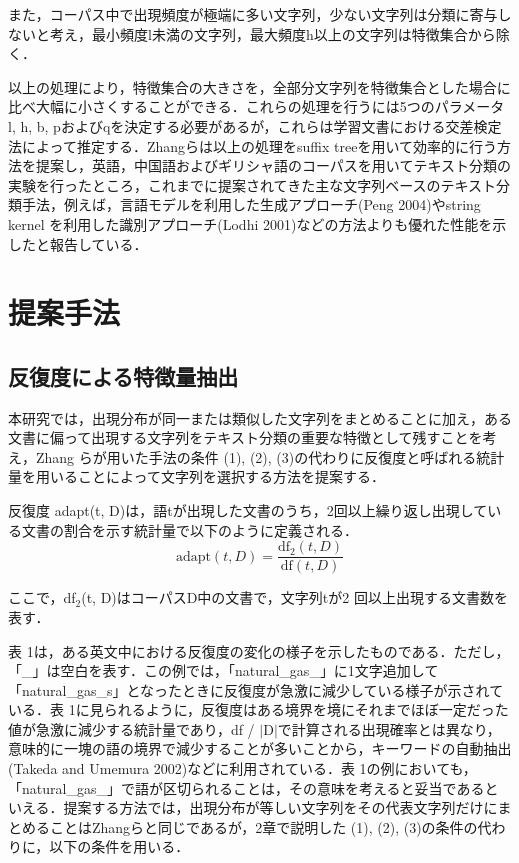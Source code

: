 \documentclass[japanese]{jnlp_1.4}
\begin{document}
また，コーパス中で出現頻度が極端に多い文字列，少ない文字列は分類に寄与しないと考え，最小頻度l未満の文字列，最大頻度h以上の文字列は特徴集合から除く．

以上の処理により，特徴集合の大きさを，全部分文字列を特徴集合とした場合に比べ大幅に小さくすることができる．これらの処理を行うには5つのパラメータl, 
h, b, 
pおよびqを決定する必要があるが，これらは学習文書における交差検定法によって推定する．Zhangらは以上の処理をsuffix 
treeを用いて効率的に行う方法を提案し，英語，中国語およびギリシャ語のコーパスを用いてテキスト分類の実験を行ったところ，これまでに提案されてきた主な文字列ベースのテキスト分類手法，例えば，言語モデルを利用した生成アプローチ(Peng 2004)やstring kernel を利用した識別アプローチ(Lodhi 2001)などの方法よりも優れた性能を示したと報告している．



\section{提案手法}


\subsection{反復度による特徴量抽出}

本研究では，出現分布が同一または類似した文字列をまとめることに加え，ある文書に偏って出現する文字列をテキスト分類の重要な特徴として残すことを考え，Zhang 
らが用いた手法の条件 (1), (2), (3)の代わりに反復度と呼ばれる統計量を用いることによって文字列を選択する方法を提案する．

反復度 adapt(t, D)は，語tが出現した文書のうち，2回以上繰り返し出現している文書の割合を示す統計量で以下のように定義される．
\[
 \text{adapt} (t,D) = \frac{\text{df}_{2}(t,D)}{\text{df}(t,D)}
\]

ここで，df$_{2}$(t, D)はコーパスD中の文書で，文字列tが2 
回以上出現する文書数を表す．



表 1は，ある英文中における反復度の変化の様子を示したものである．ただし，「{\_}」は空白を表す．この例では，「natural{\_}gas{\_}」に1文字追加して「natural{\_}gas{\_}s」となったときに反復度が急激に減少している様子が示されている．表 
1に見られるように，反復度はある境界を境にそれまでほぼ一定だった値が急激に減少する統計量であり，df 
/ $\vert $D$\vert 
$で計算される出現確率とは異なり，意味的に一塊の語の境界で減少することが多いことから，キーワードの自動抽出(Takeda and Umemura 2002)などに利用されている．表 
1の例においても，「natural{\_}gas{\_}」で語が区切られることは，その意味を考えると妥当であるといえる．提案する方法では，出現分布が等しい文字列をその代表文字列だけにまとめることはZhangらと同じであるが，2章で説明した (1), (2), (3)の条件の代わりに，以下の条件を用いる．
\end{document}
